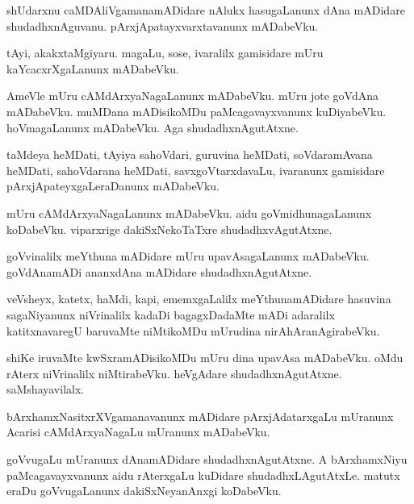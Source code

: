 \begin{mng}
shUdarxnu caMDAliVgamanamADidare nAlukx hasugaLanunx dAna mADidare shudadhxnAguvanu. pArxjApatayxvarxtavanunx mADabeVku.
\end{mng}

\begin{mng}
tAyi, akakxtaMgiyaru. magaLu, sose, ivaralilx gamisidare mUru kaYcacxrXgaLanunx mADabeVku.
\end{mng}

\begin{mng}
AmeVle mUru cAMdArxyaNagaLanunx mADabeVku. mUru jote goVdAna mADabeVku. muMDana mADisikoMDu paMcagavayxvanunx kuDiyabeVku. hoVmagaLanunx mADabeVku. Aga shudadhxnAgutAtxne.
\end{mng}

\begin{mng}
taMdeya heMDati, tAyiya sahoVdari, guruvina heMDati, soVdaramAvana heMDati, sahoVdarana heMDati, savxgoVtarxdavaLu, ivaranunx gamisidare pArxjApateyxgaLeraDanunx mADabeVku.
\end{mng}

\begin{mng}
mUru cAMdArxyaNagaLanunx mADabeVku. aidu goVmidhunagaLanunx koDabeVku. viparxrige dakiSxNekoTaTxre shudadhxvAgutAtxne.
\end{mng}

\begin{mng}
goVvinalilx meYthuna mADidare mUru upavAsagaLanunx mADabeVku. goVdAnamADi ananxdAna mADidare shudadhxnAgutAtxne.
\end{mng}

\begin{mng}
veVsheyx, katetx, haMdi, kapi, ememxgaLalilx meYthunamADidare hasuvina sagaNiyanunx niVrinalilx kadaDi bagagxDadaMte mADi adaralilx katitxnavaregU baruvaMte niMtikoMDu mUrudina nirAhAranAgirabeVku.
\end{mng}

\begin{mng}
shiKe iruvaMte kwSxramADisikoMDu mUru dina upavAsa mADabeVku. oMdu rAterx niVrinalilx niMtirabeVku. heVgAdare shudadhxnAgutAtxne. saMshayavilalx.
\end{mng}

\begin{mng}
bArxhamxNasitxrXVgamanavanunx mADidare pArxjAdatarxgaLu mUranunx Acarisi cAMdArxyaNagaLu mUranunx mADabeVku.
\end{mng}

\begin{mng}
goVvugaLu mUranunx dAnamADidare shudadhxnAgutAtxne. A bArxhamxNiyu paMcagavayxvanunx aidu rAterxgaLu kuDidare shudadhxLAgutAtxLe. matutx eraDu goVvugaLanunx dakiSxNeyanAnxgi koDabeVku.
\end{mng}

